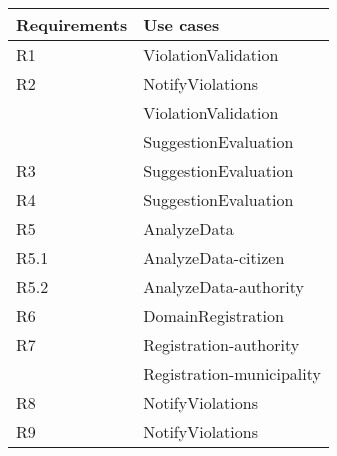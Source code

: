 \begin{tabular}{|l|>{\raggedright\arraybackslash}p{8cm}|}
	\hline 
	Requirements & Use cases \\ 
	\hline 
	R1 & ViolationValidation \\ 
	\hline 
	R2 & NotifyViolations \\ 
	   & ViolationValidation \\
	   & SuggestionEvaluation \\
	\hline 
	R3 & SuggestionEvaluation \\ 
	\hline 
	R4 & SuggestionEvaluation \\ 
	\hline 
	R5 & AnalyzeData \\ 
	\hline 
	R5.1& AnalyzeData-citizen \\ 
	\hline 
	R5.2& AnalyzeData-authority \\ 
	\hline 
	R6 & DomainRegistration \\ 
	\hline 
	R7 & Registration-authority \\ 
	   & Registration-municipality \\
	\hline 
	R8 & NotifyViolations \\ 
	\hline 
	R9 & NotifyViolations \\ 
	\hline 
\end{tabular} 

